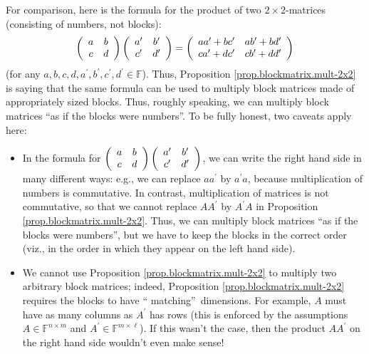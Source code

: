\documentclass[numbers=enddot,12pt,final,onecolumn,notitlepage]{scrartcl}%
\numberwithin{exer}{subsection}
\theoremstyle{definition}
\begin{document}
For comparison, here is the formula for the product of two $2\times2$-matrices
(consisting of numbers, not blocks):%
\[
\left(
\begin{array}
[c]{cc}%
a & b\\
c & d
\end{array}
\right)  \left(
\begin{array}
[c]{cc}%
a^{\prime} & b^{\prime}\\
c^{\prime} & d^{\prime}%
\end{array}
\right)  =\left(
\begin{array}
[c]{cc}%
aa^{\prime}+bc^{\prime} & ab^{\prime}+bd^{\prime}\\
ca^{\prime}+dc^{\prime} & cb^{\prime}+dd^{\prime}%
\end{array}
\right)
\]
(for any $a,b,c,d,a^{\prime},b^{\prime},c^{\prime},d^{\prime}\in\mathbb{F}$).
Thus, Proposition \ref{prop.blockmatrix.mult-2x2} is saying that the same
formula can be used to multiply block matrices made of appropriately sized
blocks. Thus, roughly speaking, we can multiply block matrices
\textquotedblleft as if the blocks were numbers\textquotedblright. To be fully
honest, two caveats apply here:

\begin{itemize}
\item In the formula for $\left(
\begin{array}
[c]{cc}%
a & b\\
c & d
\end{array}
\right)  \left(
\begin{array}
[c]{cc}%
a^{\prime} & b^{\prime}\\
c^{\prime} & d^{\prime}%
\end{array}
\right)  $, we can write the right hand side in many different ways: e.g., we
can replace $aa^{\prime}$ by $a^{\prime}a$, because multiplication of numbers
is commutative. In contrast, multiplication of matrices is not commutative, so
that we cannot replace $AA^{\prime}$ by $A^{\prime}A$ in Proposition
\ref{prop.blockmatrix.mult-2x2}. Thus, we can multiply block matrices
\textquotedblleft as if the blocks were numbers\textquotedblright, but we have
to keep the blocks in the correct order (viz., in the order in which they
appear on the left hand side).

\item We cannot use Proposition \ref{prop.blockmatrix.mult-2x2} to multiply
two arbitrary block matrices; indeed, Proposition
\ref{prop.blockmatrix.mult-2x2} requires the blocks to have \textquotedblleft
matching\textquotedblright\ dimensions. For example, $A$ must have as many
columns as $A^{\prime}$ has rows (this is enforced by the assumptions
$A\in\mathbb{F}^{n\times m}$ and $A^{\prime}\in\mathbb{F}^{m\times\ell}$). If
this wasn't the case, then the product $AA^{\prime}$ on the right hand side
wouldn't even make sense!
\end{itemize}
\end{document}
